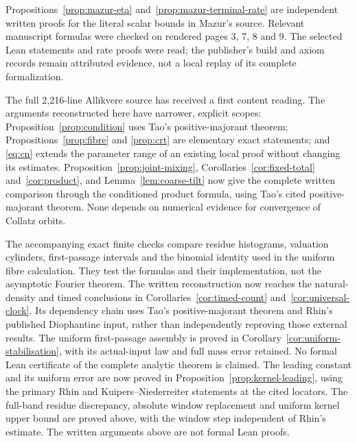 \documentclass[11pt]{article}
\theoremstyle{remark}\newtheorem{remark}[proposition]{Remark}
\begin{document}
Propositions~\ref{prop:mazur-eta} and~\ref{prop:mazur-terminal-rate}
are independent written proofs for the literal scalar bounds in Mazur's
source. Relevant manuscript formulas were checked on rendered pages
3, 7, 8 and 9. The selected Lean statements and rate proofs were read;
the publisher's build and axiom records remain attributed evidence,
not a local replay of its complete formalization.

The full 2,216-line Allikvere source has received a first content reading.
The arguments reconstructed here have narrower, explicit scopes:
Proposition~\ref{prop:condition} uses Tao's positive-majorant theorem;
Propositions~\ref{prop:fibre} and \ref{prop:crt} are elementary exact
statements; and \eqref{eq:cn} extends the parameter range of an existing
local proof without changing its estimates.
Proposition~\ref{prop:joint-mixing}, Corollaries~\ref{cor:fixed-total}
and~\ref{cor:product}, and Lemma~\ref{lem:coarse-tilt} now give the
complete written comparison through the conditioned product formula,
using Tao's cited positive-majorant theorem. None depends on numerical
evidence for convergence of Collatz orbits.

The accompanying exact finite checks compare residue histograms, valuation
cylinders, first-passage intervals and the binomial identity used in the
uniform fibre calculation. They test the formulas and their implementation,
not the asymptotic Fourier theorem. The written reconstruction now reaches
the natural-density and timed conclusions in
Corollaries~\ref{cor:timed-count} and~\ref{cor:universal-clock}.
Its dependency chain uses Tao's positive-majorant theorem and Rhin's
published Diophantine input, rather than independently reproving those
external results. The uniform first-passage assembly is proved in
Corollary~\ref{cor:uniform-stabilisation}, with its actual-input law
and full mass error retained. No formal Lean certificate of the complete
analytic theorem is claimed.
The leading constant and its uniform error are now proved in
Proposition~\ref{prop:kernel-leading}, using the primary Rhin and
Kuipers--Niederreiter statements at the cited locators.
The full-band residue discrepancy, absolute window
replacement and uniform kernel upper bound are proved above, with the
window step independent of Rhin's estimate. The written arguments above
are not formal Lean proofs.
\end{document}

